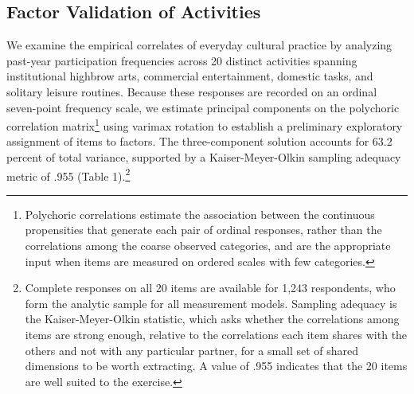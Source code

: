\documentclass[
  12pt
]{article}
\author{}
\date{}
\begin{document}
\hypertarget{factor-validation-of-activities}{%
\subsection{Factor Validation of Activities}\label{factor-validation-of-activities}}

We examine the empirical correlates of everyday cultural practice by analyzing past-year participation frequencies across 20 distinct activities spanning institutional highbrow arts, commercial entertainment, domestic tasks, and solitary leisure routines. Because these responses are recorded on an ordinal seven-point frequency scale, we estimate principal components on the polychoric correlation matrix\footnote{Polychoric correlations estimate the association between the continuous propensities that generate each pair of ordinal responses, rather than the correlations among the coarse observed categories, and are the appropriate input when items are measured on ordered scales with few categories.} using varimax rotation to establish a preliminary exploratory assignment of items to factors. The three-component solution accounts for 63.2 percent of total variance, supported by a Kaiser-Meyer-Olkin sampling adequacy metric of .955 (Table 1).\footnote{Complete responses on all 20 items are available for 1,243 respondents, who form the analytic sample for all measurement models. Sampling adequacy is the Kaiser-Meyer-Olkin statistic, which asks whether the correlations among items are strong enough, relative to the correlations each item shares with the others and not with any particular partner, for a small set of shared dimensions to be worth extracting. A value of .955 indicates that the 20 items are well suited to the exercise.} 
\end{document}
